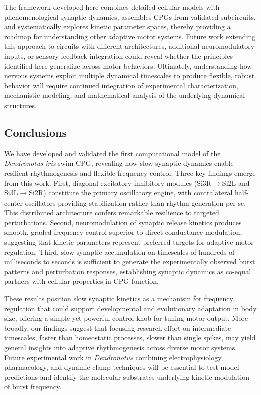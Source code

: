 \documentclass[nofootinbib,aip,amsmath,amssymb,preprint,twocolumn,floatfix,10pt]{revtex4-2}
\begin{document}
The framework developed here combines detailed cellular models with phenomenological synaptic dynamics, assembles CPGs from validated subcircuits, and systematically explores kinetic parameter spaces, thereby providing a roadmap for understanding other adaptive motor systems. Future work extending this approach to circuits with different architectures, additional neuromodulatory inputs, or sensory feedback integration could reveal whether the principles identified here generalize across motor behaviors. Ultimately, understanding how nervous systems exploit multiple dynamical timescales to produce flexible, robust behavior will require continued integration of experimental characterization, mechanistic modeling, and mathematical analysis of the underlying dynamical structures.

\subsection{Conclusions}

We have developed and validated the first computational model of the \textit{Dendronotus iris} swim CPG, revealing how slow synaptic dynamics enable resilient rhythmogenesis and flexible frequency control. Three key findings emerge from this work. First, diagonal excitatory-inhibitory modules (Si3R$\to$Si2L and Si3L$\to$Si2R) constitute the primary oscillatory engine, with contralateral half-center oscillators providing stabilization rather than rhythm generation per se. This distributed architecture confers remarkable resilience to targeted perturbations. Second, neuromodulation of synaptic release kinetics produces smooth, graded frequency control superior to direct conductance modulation, suggesting that kinetic parameters represent preferred targets for adaptive motor regulation. Third, slow synaptic accumulation on timescales of hundreds of milliseconds to seconds is sufficient to generate the experimentally observed burst patterns and perturbation responses, establishing synaptic dynamics as co-equal partners with cellular properties in CPG function.

These results position slow synaptic kinetics as a mechanism for frequency regulation that could support developmental and evolutionary adaptation in body size, offering a simple yet powerful control knob for tuning motor output. More broadly, our findings suggest that focusing research effort on intermediate timescales, faster than homeostatic processes, slower than single spikes, may yield general insights into adaptive rhythmogenesis across diverse motor systems. Future experimental work in \textit{Dendronotus} combining electrophysiology, pharmacology, and dynamic clamp techniques will be essential to test model predictions and identify the molecular substrates underlying kinetic modulation of burst frequency.
\end{document}
